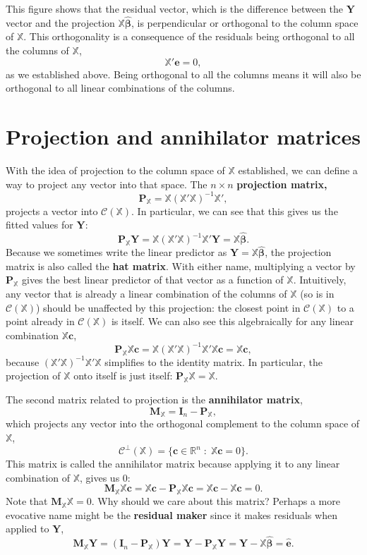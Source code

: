 \documentclass[
  13pt,
  letterpaper,
  DIV=11,
  numbers=noendperiod]{scrreprt}
\newcommand{\mb}{\symbf}
\newcommand{\Xmat}{\mathbb{X}}
\newcommand{\bhat}{\widehat{\mb{\beta}}}
\theoremstyle{definition}
\theoremstyle{definition}
\theoremstyle{plain}
\theoremstyle{remark}
\begin{document}
This figure shows that the residual vector, which is the difference
between the \(\mb{Y}\) vector and the projection \(\Xmat\bhat\), is
perpendicular or orthogonal to the column space of \(\Xmat\). This
orthogonality is a consequence of the residuals being orthogonal to all
the columns of \(\Xmat\), \[ 
\Xmat'\mb{e} = 0,
\] as we established above. Being orthogonal to all the columns means it
will also be orthogonal to all linear combinations of the columns.

\section{Projection and annihilator
matrices}\label{projection-and-annihilator-matrices}

With the idea of projection to the column space of \(\Xmat\)
established, we can define a way to project any vector into that space.
The \(n\times n\) \textbf{projection matrix,} \[
\mb{P}_{\Xmat} = \Xmat (\Xmat'\Xmat)^{-1} \Xmat',
\] projects a vector into \(\mathcal{C}(\Xmat)\). In particular, we can
see that this gives us the fitted values for \(\mb{Y}\): \[ 
\mb{P}_{\Xmat}\mb{Y} = \Xmat (\Xmat'\Xmat)^{-1} \Xmat'\mb{Y} = \Xmat\bhat.
\] Because we sometimes write the linear predictor as
\(\widehat{\mb{Y}} = \Xmat\bhat\), the projection matrix is also called
the \textbf{hat matrix}. With either name, multiplying a vector by
\(\mb{P}_{\Xmat}\) gives the best linear predictor of that vector as a
function of \(\Xmat\). Intuitively, any vector that is already a linear
combination of the columns of \(\Xmat\) (so is in
\(\mathcal{C}(\Xmat)\)) should be unaffected by this projection: the
closest point in \(\mathcal{C}(\Xmat)\) to a point already in
\(\mathcal{C}(\Xmat)\) is itself. We can also see this algebraically for
any linear combination \(\Xmat\mb{c}\), \[
\mb{P}_{\Xmat}\Xmat\mb{c} = \Xmat (\Xmat'\Xmat)^{-1} \Xmat'\Xmat\mb{c} = \Xmat\mb{c},
\] because \((\Xmat'\Xmat)^{-1} \Xmat'\Xmat\) simplifies to the identity
matrix. In particular, the projection of \(\Xmat\) onto itself is just
itself: \(\mb{P}_{\Xmat}\Xmat = \Xmat\).

The second matrix related to projection is the \textbf{annihilator
matrix}, \[ 
\mb{M}_{\Xmat} = \mb{I}_{n} - \mb{P}_{\Xmat},
\] which projects any vector into the orthogonal complement to the
column space of \(\Xmat\), \[
\mathcal{C}^{\perp}(\Xmat) = \{\mb{c} \in \mathbb{R}^n\;:\; \Xmat\mb{c} = 0 \}.
\] This matrix is called the annihilator matrix because applying it to
any linear combination of \(\Xmat\), gives us 0: \[ 
\mb{M}_{\Xmat}\Xmat\mb{c} = \Xmat\mb{c} - \mb{P}_{\Xmat}\Xmat\mb{c} = \Xmat\mb{c} - \Xmat\mb{c} = 0.
\] Note that \(\mb{M}_{\Xmat}\Xmat = 0\). Why should we care about this
matrix? Perhaps a more evocative name might be the \textbf{residual
maker} since it makes residuals when applied to \(\mb{Y}\), \[ 
\mb{M}_{\Xmat}\mb{Y} = (\mb{I}_{n} - \mb{P}_{\Xmat})\mb{Y} = \mb{Y} - \mb{P}_{\Xmat}\mb{Y} = \mb{Y} - \Xmat\bhat = \widehat{\mb{e}}.
\]
\end{document}

